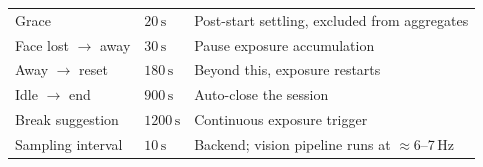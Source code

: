 \begin{table}[htbp]
\begin{tabular}{@{}llp{6.4cm}@{}}
Grace                & $20\,\text{s}$             & Post-start settling, excluded from aggregates \\
Face lost $\to$ away & $30\,\text{s}$             & Pause exposure accumulation \\
Away $\to$ reset     & $180\,\text{s}$            & Beyond this, exposure restarts \\
Idle $\to$ end       & $900\,\text{s}$            & Auto-close the session \\
Break suggestion     & $1200\,\text{s}$           & Continuous exposure trigger \\
Sampling interval    & $10\,\text{s}$             & Backend; vision pipeline runs at $\approx$6--7\,Hz \\
\bottomrule
\end{tabular}
\end{table}
